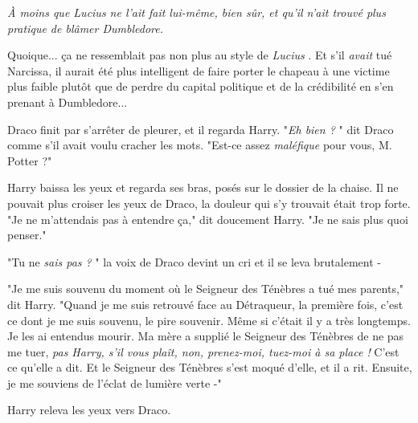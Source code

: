 \emph{À moins que Lucius ne l'ait fait lui-même, bien sûr, et qu'il n'ait trouvé plus pratique de blâmer Dumbledore.} 

Quoique... ça ne ressemblait pas non plus au style de \emph{Lucius} . Et s'il \emph{avait}  tué Narcissa, il aurait été plus intelligent de faire porter le chapeau à une victime plus faible plutôt que de perdre du capital politique et de la crédibilité en s'en prenant à Dumbledore...

Draco finit par s'arrêter de pleurer, et il regarda Harry. "\emph{Eh bien ?} " dit Draco comme s'il avait voulu cracher les mots. "Est-ce assez \emph{maléfique}  pour vous, M. Potter ?"

Harry baissa les yeux et regarda ses bras, posés sur le dossier de la chaise. Il ne pouvait plus croiser les yeux de Draco, la douleur qui s'y trouvait était trop forte. "Je ne m'attendais pas à entendre ça," dit doucement Harry. "Je ne sais plus quoi penser."

"Tu ne \emph{sais pas ?} " la voix de Draco devint un cri et il se leva brutalement -

"Je me suis souvenu du moment où le Seigneur des Ténèbres a tué mes parents," dit Harry. "Quand je me suis retrouvé face au Détraqueur, la première fois, c'est ce dont je me suis souvenu, le pire souvenir. Même si c'était il y a très longtemps. Je les ai entendus mourir. Ma mère a supplié le Seigneur des Ténèbres de ne pas me tuer, \emph{pas Harry, s'il vous plaît, non, prenez-moi, tuez-moi à sa place !}  C'est ce qu'elle a dit. Et le Seigneur des Ténèbres s'est moqué d'elle, et il a rit. Ensuite, je me souviens de l'éclat de lumière verte -"

Harry releva les yeux vers Draco.

